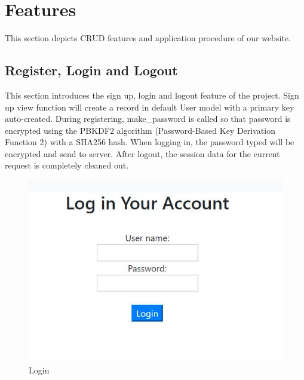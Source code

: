 \documentclass[12pt]{article}
\begin{document}
	\newpage
	\section{Features}
	\qquad This section depicts CRUD features and application procedure of our website.
	
	\subsection{Register, Login and Logout}
	\qquad This section introduces the sign up, login and logout feature of the project. Sign up view function will create a record in default User model with a primary key auto-created. During registering, make\_password is called so that password is encrypted using the PBKDF2 algorithm (Password-Based Key Derivation Function 2) with a SHA256 hash. When logging in, the password typed will be encrypted and send to server. After logout, the session data for the current request is completely cleaned out.\\
	\begin{figure}[H]
		\centering
		\includegraphics[scale=0.8]{login}
		\caption{Login}
	\end{figure}
\end{document}

